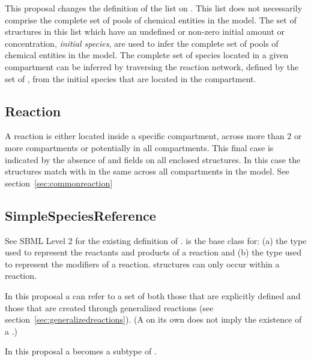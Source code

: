 \documentclass{cekarticle}
\begin{document}
This proposal changes the definition of the  list on .
This list does not necessarily comprise the complete set of pools of chemical entities in the model.
The set of  structures in this list which have an undefined or non-zero
initial amount or concentration, \emph{initial species}, are used to infer the complete set
of pools of chemical entities in the model.  The complete set of species located in a given
compartment can be inferred by traversing the reaction
network, defined by the set of , from the initial species that are located in
the compartment.

\subsection{Reaction}

A reaction
is either located inside a specific compartment, across more than 2 or more compartments or
 potentially in all compartments.  This final case is indicated by the absence of 
 and  fields on all enclosed 
structures. In this case the  structures match with 
in the same  across all compartments in the model.
See section~\ref{sec:commonreaction}

\subsection{SimpleSpeciesReference}

See SBML Level 2 for the existing definition of .
 is the base class for: (a)  the type used
to represent the reactants and products of a reaction and (b)  the
type used to represent the modifiers of a reaction.   structures
can only occur within a reaction.

In this proposal a  can refer to a set of  both
those that are explicitly defined and those that are created through generalized reactions
(see section~\ref{sec:generalizedreactions}).  (A  on its own does not
imply the existence of a .)

In this proposal a  becomes a subtype of .
\end{document}
